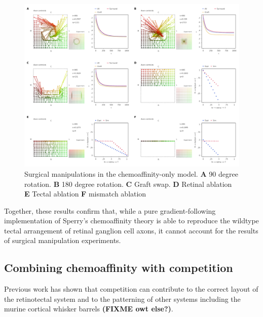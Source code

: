 \documentclass[11pt, a4paper, draft]{article}
\begin{document}
\begin{figure}
\includegraphics[width=0.95\linewidth]{./images/fig_chemo_manipulations.png}
\caption{Surgical manipulations in the chemoaffinity-only model. \textbf{A} 90 degree
rotation. \textbf{B} 180 degree rotation. \textbf{C} Graft swap. \textbf{D}
Retinal ablation \textbf{E} Tectal ablation \textbf{F} mismatch ablation}
\label{f:Gsurg}
\end{figure}

Together, these results confirm that, while a pure gradient-following
implementation of Sperry's chemoaffinity theory is able to reproduce the
wildtype tectal arrangement of retinal ganglion cell axons, it cannot account
for the results of surgical manipulation experiments.

\subsection*{Combining chemoaffinity with competition}

Previous work has shown that competition can contribute to the correct layout
of the retinotectal system \citep{stuff} and to the patterning of other
systems including the murine cortical whisker
barrels \citep{james_modelling_2020} \textbf{(FIXME owt else?)}.
\end{document}
